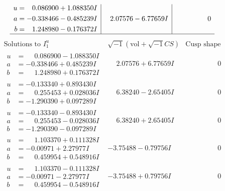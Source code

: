 \documentclass[1p]{elsarticle_modified}
\theoremstyle{definition}
\newcommand{\I}{\sqrt{-1}}
\begin{document}
$$\begin{array}{c|c|c}
\begin{aligned}
u &= \phantom{-}0.086900 + 1.088350 I \\
a &= -0.338466 - 0.485239 I \\
b &= \phantom{-}1.248980 - 0.176372 I\end{aligned}
 & \phantom{-}2.07576 - 6.77659 I & \phantom{-0.000000 } 0\\
 \hline 
 \end{array}$$\newpage$$\begin{array}{c|c|c}  
\text{Solutions to }I^u_{1}& \I (\text{vol} + \sqrt{-1}CS) & \text{Cusp shape}\\
 \hline 
\begin{aligned}
u &= \phantom{-}0.086900 - 1.088350 I \\
a &= -0.338466 + 0.485239 I \\
b &= \phantom{-}1.248980 + 0.176372 I\end{aligned}
 & \phantom{-}2.07576 + 6.77659 I & \phantom{-0.000000 } 0 \\ \hline\begin{aligned}
u &= -0.133340 + 0.893430 I \\
a &= \phantom{-}0.255453 + 0.028036 I \\
b &= -1.290390 + 0.097289 I\end{aligned}
 & \phantom{-}6.38240 - 2.65405 I & \phantom{-0.000000 } 0 \\ \hline\begin{aligned}
u &= -0.133340 - 0.893430 I \\
a &= \phantom{-}0.255453 - 0.028036 I \\
b &= -1.290390 - 0.097289 I\end{aligned}
 & \phantom{-}6.38240 + 2.65405 I & \phantom{-0.000000 } 0 \\ \hline\begin{aligned}
u &= \phantom{-}1.103370 + 0.111328 I \\
a &= -0.00971 + 2.27977 I \\
b &= \phantom{-}0.459954 + 0.548916 I\end{aligned}
 & -3.75488 - 0.79756 I & \phantom{-0.000000 } 0 \\ \hline\begin{aligned}
u &= \phantom{-}1.103370 - 0.111328 I \\
a &= -0.00971 - 2.27977 I \\
b &= \phantom{-}0.459954 - 0.548916 I\end{aligned}
 & -3.75488 + 0.79756 I & \phantom{-0.000000 } 0 \\ \hline\begin{aligned}

\end{aligned}
\end{array}$$
\end{document}
